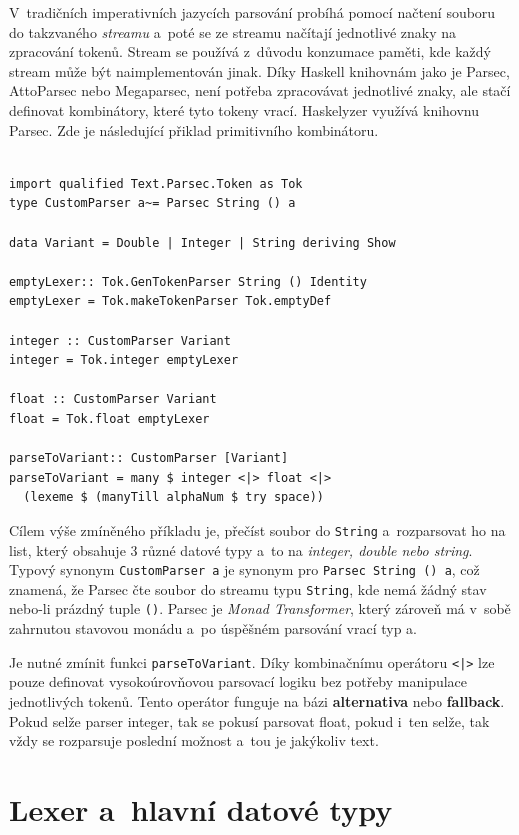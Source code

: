 \documentclass[male, czech]{kithesis}
\newcommand{\haskellInline}[1]{\colorbox{gray!10}{\texttt{#1}}}
\begin{document}
V~tradičních imperativních jazycích parsování probíhá pomocí načtení souboru 
do takzvaného \textit{streamu}
a~poté se ze streamu načítají jednotlivé znaky na zpracování tokenů. 
Stream se používá z~důvodu konzumace paměti, 
kde každý stream může být naimplementován jinak.
Díky Haskell knihovnám jako je Parsec, 
AttoParsec nebo Megaparsec,
není potřeba zpracovávat jednotlivé znaky, 
ale stačí definovat kombinátory, 
které tyto tokeny vrací. 
Haskelyzer využívá knihovnu Parsec. 
Zde je následující přiklad primitivního kombinátoru.

\begin{verbatim}

import qualified Text.Parsec.Token as Tok
type CustomParser a~= Parsec String () a

data Variant = Double | Integer | String deriving Show

emptyLexer:: Tok.GenTokenParser String () Identity
emptyLexer = Tok.makeTokenParser Tok.emptyDef

integer :: CustomParser Variant 
integer = Tok.integer emptyLexer 

float :: CustomParser Variant 
float = Tok.float emptyLexer 

parseToVariant:: CustomParser [Variant]
parseToVariant = many $ integer <|> float <|> 
  (lexeme $ (manyTill alphaNum $ try space))

\end{verbatim}

Cílem výše zmíněného příkladu je, 
přečíst soubor do \haskellInline{String} 
a~rozparsovat ho na list, 
který obsahuje 3 různé datové typy 
a~to na \textit{integer, double nebo string}.
Typový synonym \haskellInline{CustomParser a} 
je synonym pro \haskellInline{Parsec String () a},
což znamená, 
že Parsec čte soubor do streamu typu \haskellInline{String}, 
kde nemá žádný stav nebo-li prázdný tuple \haskellInline{()}. 
Parsec je \textit{Monad Transformer},
který zároveň má v~sobě zahrnutou stavovou monádu
a~po úspěšném parsování vrací typ a. 

Je nutné zmínit funkci \haskellInline{parseToVariant}. 
Díky kombinačnímu operátoru \haskellInline{<|>} 
lze pouze definovat vysokoúrovňovou parsovací logiku bez potřeby manipulace jednotlivých tokenů. 
Tento operátor funguje na bázi \textbf{alternativa} nebo
\textbf{fallback}. 
Pokud selže parser integer, 
tak se pokusí parsovat float, 
pokud i~ten selže, 
tak vždy se rozparsuje poslední možnost
a~tou je jakýkoliv text.

\section{Lexer a~hlavní datové typy}
\end{document}
